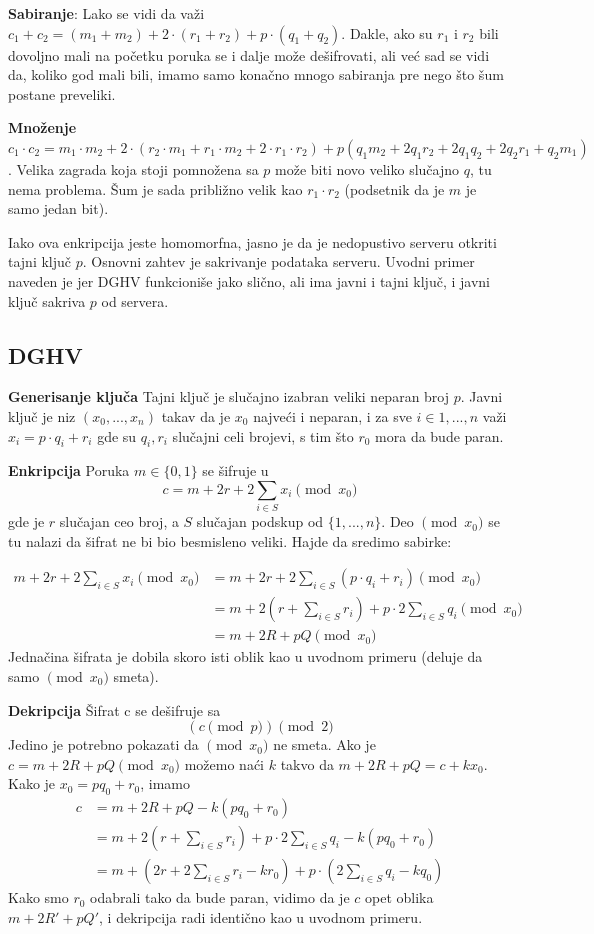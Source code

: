 \textbf{Sabiranje}:  Lako se vidi da va\v zi $c_1 + c_2 = (m_1 + m_2) + 2\cdot (r_1 + r_2) + p\cdot (q_1 + q_2)$.
Dakle, ako su $r_1$ i $r_2$ bili dovoljno mali na po\v cetku poruka se i dalje mo\v ze de\v sifrovati, ali ve\' c sad se vidi da, koliko god mali bili, imamo samo kona\v cno mnogo sabiranja pre nego \v sto \v sum postane preveliki.

\textbf{Mno\v zenje} $c_1\cdot c_2 = m_1\cdot m_2 + 2\cdot (r_2\cdot m_1 + r_1\cdot m_2 + 2\cdot r_1\cdot r_2) + p(q_1m_2 + 2q_1r_2 + 2q_1q_2 + 2q_2r_1 + q_2m_1)$. Velika zagrada koja stoji pomno\v zena sa $p$ mo\v ze biti novo veliko slu\v cajno $q$, tu nema problema. \v Sum je sada pribli\v zno velik kao $r_1\cdot r_2$ (podsetnik da je $m$ je samo jedan bit).

Iako ova enkripcija jeste homomorfna, jasno je da je nedopustivo serveru otkriti tajni klju\v c $p$. Osnovni zahtev je sakrivanje podataka serveru. Uvodni primer naveden je jer DGHV funkcioni\v se jako sli\v cno, ali ima javni i tajni klju\v c, i javni klju\v c sakriva $p$ od servera.

\subsection{DGHV}

\textbf{Generisanje klju\v ca} Tajni klju\v c je slu\v cajno izabran veliki neparan broj $p$. Javni klju\v c je niz $(x_0, ..., x_n)$ takav da je $x_0$ najve\' ci i neparan, i za sve $i\in {1, ..., n}$ va\v zi $x_i = p\cdot q_i + r_i $ gde su 
$q_i, r_i$ slu\v cajni celi brojevi, s tim \v sto $r_0$ mora da bude paran.


\textbf{Enkripcija} Poruka $m \in \{0, 1\}$ se \v sifruje u \[c = m + 2r + 2\sum_{i\in S}x_i \pmod{x_0}\] gde je $r$ slu\v cajan ceo broj, a  $S$ slu\v cajan podskup od $\{1, ..., n\}$. Deo $\pmod{x_0}$ se tu nalazi da \v sifrat ne bi bio besmisleno veliki.
Hajde da sredimo sabirke:

\begin{align*}
m + 2r + 2\sum_{i\in S}x_i \pmod{x_0} &= m + 2 r + 2\sum_{i\in S}(p\cdot q_i + r_i) \pmod{x_0}\\
&= m + 2(r + \sum_{i\in S} r_i) + p\cdot 2\sum_{i\in S}q_i \pmod{x_0}\\
&= m + 2R + pQ \pmod{x_0}
\end{align*}
Jedna\v cina \v sifrata je dobila skoro isti oblik kao u uvodnom primeru (deluje da samo $\pmod{x_0}$ smeta).


\textbf{Dekripcija} \v Sifrat c se de\v sifruje sa \[(c \pmod{p}) \pmod{2}\]
Jedino je potrebno pokazati da $\pmod{x_0}$ ne smeta. Ako je $c = m + 2R + pQ \pmod{x_0}$ mo\v zemo na\' ci $k$ takvo da $m + 2R + pQ = c + kx_0$. Kako je $x_0 = pq_0 + r_0$, imamo
\begin{align*}
    c &= m + 2R + pQ - k(pq_0 + r_0)\\
    &= m + 2(r + \sum_{i\in S} r_i) + p\cdot 2\sum_{i\in S}q_i - k(pq_0 + r_0)\\
    &= m + (2r + 2\sum_{i\in S} r_i - kr_0) + p\cdot (2\sum_{i\in S}q_i - kq_0)
\end{align*} 
Kako smo $r_0$ odabrali tako da bude paran, vidimo da je $c$ opet oblika $m + 2R' + pQ'$, i dekripcija radi identi\v cno kao u uvodnom primeru.

